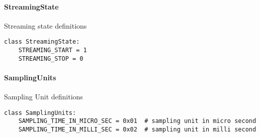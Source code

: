 \paragraph{StreamingState}\label{StreamingState}

Streaming state definitions

\begin{lstlisting}
class StreamingState:
	STREAMING_START = 1
	STREAMING_STOP = 0
\end{lstlisting}

\paragraph{SamplingUnits}\label{SamplingUnits}

Sampling Unit definitions

\begin{lstlisting}
class SamplingUnits:
    SAMPLING_TIME_IN_MICRO_SEC = 0x01  # sampling unit in micro second
    SAMPLING_TIME_IN_MILLI_SEC = 0x02  # sampling unit in milli second
\end{lstlisting}

